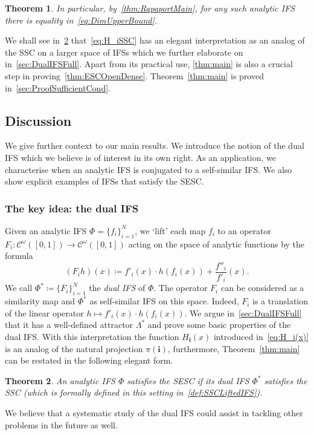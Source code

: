 \documentclass[12pt,]{article}
\newtheorem{theorem}{Theorem}[section]
\theoremstyle{definition}
\theoremstyle{remark}
\newcommand{\0}{\mathbf{0}}
\newcommand{\bi}{\mathbf{i}}
\begin{document}
{\begin{theorem}
In particular, by~\cref{thm:RapaportMain}, for any such analytic IFS there is equality in~\cref{eq:DimUpperBound}.
\end{theorem}

We shall see in~\cref{thm:DualSSC} that~\cref{eq:H_iSSC} has an elegant interpretation as an analog of the SSC on a larger space of IFSs which we further elaborate on in~\cref{sec:DualIFSFull}. Apart from its practical use, \cref{thm:main} is also a crucial step in proving~\cref{thm:ESCOpenDense}. Theorem~\ref{thm:main} is proved in~\cref{sec:ProofSufficientCond}.

\subsection{Discussion}

We give further context to our main results. We introduce the notion of the dual IFS which we believe is of interest in its own right. As an application, we characterise when an analytic IFS is conjugated to a self-similar IFS. We also show explicit examples of IFSs that satisfy the SESC.   

\subsubsection{The key idea: the dual IFS}\label{sec:IntroDualIFS}

Given an analytic IFS $\Phi=\{f_i\}_{i=1}^N$, we `lift' each map $f_i$ to an operator $F_i: \mathcal{C}^{\omega}([0,1]) \to \mathcal{C}^{\omega}([0,1])$ acting on the space of analytic functions by the formula
\begin{equation*}
	(F_i h)(x)\coloneqq f'_i(x)\cdot h(f_i(x)) + \frac{f''_i}{f'_i}(x).
\end{equation*}
We call $\Phi^*\coloneqq\{F_i\}_{i=1}^N$ the \emph{dual IFS} of $\Phi$. The operator $F_i$ can be considered as a similarity map and $\Phi^*$ as self-similar IFS on this space. Indeed, $F_i$ is a translation of the linear operator $h\mapsto f'_i(x)\cdot h(f_i(x))$. We argue in~\cref{sec:DualIFSFull} that it has a well-defined attractor $\Lambda^*$ and prove some basic properties of the dual IFS. With this interpretation the function $H_{\bi}(x)$ introduced in~\cref{eq:H_i(x)} is an analog of the natural projection $\pi(\bi)$, furthermore, Theorem~\ref{thm:main} can be restated in the following elegant form.
\begin{theorem}\label{thm:DualSSC}
An analytic IFS $\Phi$ satisfies the SESC if its dual IFS $\Phi^*$ satisfies the SSC (which is formally defined in this setting in~\cref{def:SSCLiftedIFS}).
\end{theorem}
We believe that a systematic study of the dual IFS could assist in tackling other problems in the future as well.

}
\end{document}
